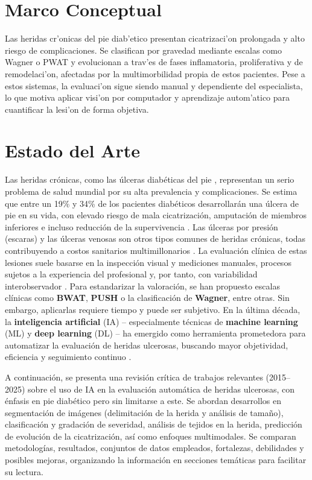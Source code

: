                 

\section{Marco Conceptual}
\label{sc:MC}


Las heridas cr'onicas del pie diab'etico presentan cicatrizaci'on prolongada y alto riesgo de complicaciones. Se clasifican por gravedad mediante escalas como Wagner o PWAT y evolucionan a trav'es de fases inflamatoria, proliferativa y de remodelaci'on, afectadas por la multimorbilidad propia de estos pacientes. Pese a estos sistemas, la evaluaci'on sigue siendo manual y dependiente del especialista, lo que motiva aplicar visi'on por computador y aprendizaje autom'atico para cuantificar la lesi'on de forma objetiva.



\section{Estado del Arte}
\label{sc:EA}


Las heridas crónicas, como las úlceras diabéticas del pie , representan un serio problema de salud mundial por su alta prevalencia y complicaciones. Se estima que entre un 19\% y 34\% de los pacientes diabéticos desarrollarán una úlcera de pie en su vida, con elevado riesgo de mala cicatrización, amputación de miembros inferiores e incluso reducción de la supervivencia \cite{Zhang2022}. Las úlceras por presión (escaras) y las úlceras venosas son otros tipos comunes de heridas crónicas, todas contribuyendo a costos sanitarios multimillonarios \cite{Wang2020,Sendilraj2024}. La evaluación clínica de estas lesiones suele basarse en la inspección visual y mediciones manuales, procesos sujetos a la experiencia del profesional y, por tanto, con variabilidad interobservador \cite{Curti2024}. Para estandarizar la valoración, se han propuesto escalas clínicas como \textbf{BWAT}, \textbf{PUSH} o la clasificación de \textbf{Wagner}, entre otras. Sin embargo, aplicarlas requiere tiempo y puede ser subjetivo. En la última década, la \textbf{inteligencia artificial} (IA) – especialmente técnicas de \textbf{machine learning} (ML) y \textbf{deep learning} (DL) – ha emergido como herramienta prometedora para automatizar la evaluación de heridas ulcerosas, buscando mayor objetividad, eficiencia y seguimiento continuo \cite{Sendilraj2024,Curti2024}.

A continuación, se presenta una revisión crítica de trabajos relevantes (2015–2025) sobre el uso de IA en la evaluación automática de heridas ulcerosas, con énfasis en pie diabético pero sin limitarse a este. Se abordan desarrollos en segmentación de imágenes (delimitación de la herida y análisis de tamaño), clasificación y gradación de severidad, análisis de tejidos en la herida, predicción de evolución de la cicatrización, así como enfoques multimodales. Se comparan metodologías, resultados, conjuntos de datos empleados, fortalezas, debilidades y posibles mejoras, organizando la información en secciones temáticas para facilitar su lectura.

